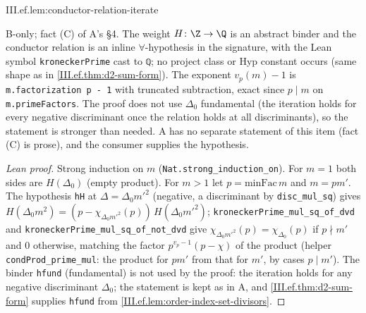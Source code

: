 \begin{lemma}
\bonly
{}
\end{lemma}
\begin{tfformal}{III.ef.lem:conductor-relation-iterate}
\begin{tffidelity}
B-only; fact (C) of A's \S4. The weight $H\colon\Z\to\Q$ is an abstract binder and the conductor relation is an inline $\forall$-hypothesis in the signature, with the Lean symbol \texttt{kroneckerPrime} cast to \texttt{ℚ}; no project class or Hyp constant occurs (same shape as in \cref{III.ef.thm:d2-sum-form}). The exponent $v_p(m)-1$ is \texttt{m.factorization p - 1} with truncated subtraction, exact since $p\mid m$ on \texttt{m.primeFactors}. The proof does not use $\Delta_0$ fundamental (the iteration holds for every negative discriminant once the relation holds at all discriminants), so the statement is stronger than needed. A has no separate statement of this item (fact (C) is prose), and the consumer supplies the hypothesis.
\end{tffidelity}
\end{tfformal}
\begin{proof}[Lean proof]
Strong induction on $m$ (\texttt{Nat.strong\_induction\_on}). For $m=1$ both sides are $H(\Delta_0)$ (empty product). For $m>1$ let $p=\mathrm{minFac}\,m$ and $m=pm'$. The hypothesis \texttt{hH} at $\Delta=\Delta_0m'^2$ (negative, a discriminant by \texttt{disc\_mul\_sq}) gives $H(\Delta_0m^2)=(p-\chi_{\Delta_0m'^2}(p))\,H(\Delta_0m'^2)$; \texttt{kroneckerPrime\_mul\_sq\_of\_dvd} and \texttt{kroneckerPrime\_mul\_sq\_of\_not\_dvd} give $\chi_{\Delta_0m'^2}(p)=\chi_{\Delta_0}(p)$ if $p\nmid m'$ and $0$ otherwise, matching the factor $p^{v_p-1}(p-\chi)$ of the product (helper \texttt{condProd\_prime\_mul}: the product for $pm'$ from that for $m'$, by cases $p\mid m'$). The binder \texttt{hfund} (fundamental) is not used by the proof: the iteration holds for any negative discriminant $\Delta_0$; the statement is kept as in A, and \cref{III.ef.thm:d2-sum-form} supplies \texttt{hfund} from \cref{III.ef.lem:order-index-set-divisors}.
\end{proof}

